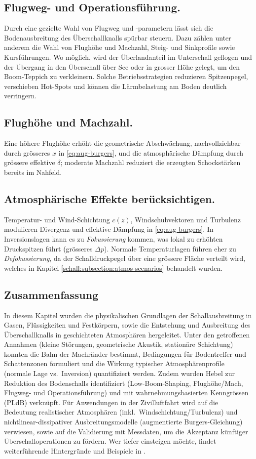 \subsection*{Flugweg- und Operationsführung.}
Durch eine gezielte Wahl von Flugweg und -parametern lässt sich die
Bodenausbreitung des Überschallknalls spürbar steuern.
Dazu zählen unter anderem die Wahl von Flughöhe und Machzahl, Steig-
und Sinkprofile sowie Kursführungen.
Wo möglich, wird der Überlandanteil im Unterschall geflogen und der
Übergang in den Überschall über See oder in grosser Höhe gelegt,
um den Boom-Teppich zu verkleinern.
Solche Betriebsstrategien reduzieren Spitzenpegel, verschieben Hot-Spots
und können die Lärmbelastung am Boden deutlich verringern.

\subsection*{Flughöhe und Machzahl.}
Eine höhere Flughöhe erhöht die geometrische Abschwächung, nachvollziehbar durch
grösseres $x$ in \eqref{eq:aug-burgers}, und die atmosphärische Dämpfung durch
grössere effektive $\delta$; moderate Machzahl reduziert die erzeugten
Schockstärken bereits im Nahfeld.

\subsection*{Atmosphärische Effekte berücksichtigen.}
Temperatur- und Wind-Schichtung $c(z)$, Windschubvektoren und Turbulenz
modulieren Divergenz und effektive Dämpfung in \eqref{eq:aug-burgers}.
In Inversionslagen kann es zu \emph{Fokussierung} kommen, was lokal
zu erhöhten Druckspitzen führt (grösseres $\Delta p$).
Normale Temperaturlagen führen eher zu \emph{Defokussierung},
da der Schalldruckpegel über eine grössere Fläche verteilt wird,
welches in Kapitel \ref{schall:subsection:atmos-scenarios} behandelt wurden.

\subsection*{Zusammenfassung}
In diesem Kapitel wurden die physikalischen Grundlagen der
Schallausbreitung in Gasen, Flüssigkeiten und Festkörpern, sowie die
Entstehung und Ausbreitung des Überschallknalls in geschichteten
Atmosphären hergeleitet.
Unter den getroffenen Annahmen (kleine Störungen, geometrische Akustik,
stationäre Schichtung) konnten die Bahn der Machränder bestimmt,
Bedingungen für Bodentreffer und Schattenzonen formuliert und die Wirkung
typischer Atmosphärenprofile (normale Lage vs.\ Inversion) quantifiziert werden.
Zudem wurden Hebel zur Reduktion des Bodenschalls identifiziert
(Low-Boom-Shaping, Flughöhe/Mach, Flugweg- und Operationsführung) und mit
wahrnehmungsbasierten Kenngrössen (PLdB) verknüpft.
Für Anwendungen in der Zivilluftfahrt wird auf die Bedeutung
realistischer Atmosphären (inkl.\ Windschichtung/Turbulenz) und
nichtlinear-dissipativer Ausbreitungsmodelle
(augmentierte Burgers-Gleichung) verwiesen,
sowie auf die Validierung mit Messdaten, um die Akzeptanz künftiger
Überschalloperationen zu fördern.
Wer tiefer einsteigen möchte, findet weiterführende Hintergründe und
Beispiele in
\cite{schall:darden75, schall:x59pldb, schall:seebassgeorge, schall:whitham, schall:burgersJASA}.
